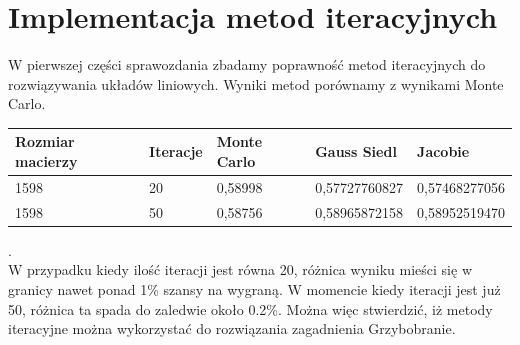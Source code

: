 \documentclass[8pt]{article}
\begin{document}
\section*{Implementacja metod iteracyjnych}
W pierwszej części sprawozdania zbadamy poprawność metod iteracyjnych do rozwiązywania układów liniowych. Wyniki metod porównamy z wynikami Monte Carlo.\\
\begin{center}
\begin{tabular}{| p{3.2cm} | p{1.2cm}| p{2.2cm} | p{2.5cm} | p{2.5cm} | }
  \hline
  Rozmiar macierzy & Iteracje & Monte Carlo & Gauss Siedl & Jacobie \\\hline
  1598 &20&0,58998& 0,57727760827 & 0,57468277056 \\\hline
  1598 &50&0,58756& 0,58965872158 & 0,58952519470 \\\hline
  
  \hline
\end{tabular}
\end{center}
 .\\W przypadku kiedy ilość iteracji jest równa 20, różnica wyniku mieści się w granicy nawet ponad 1\% szansy na wygraną. W momencie kiedy iteracji jest już 50, różnica ta spada do zaledwie około 0.2\%.  Można więc stwierdzić, iż metody iteracyjne można wykorzystać do rozwiązania zagadnienia Grzybobranie.
\end{document}
